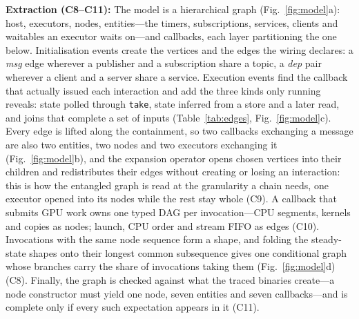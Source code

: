 \textbf{Extraction (C8--C11):} The model is a hierarchical graph (Fig.~\ref{fig:model}a): host, executors, nodes, entities---the timers, subscriptions, services, clients and waitables an executor waits on---and callbacks, each layer partitioning the one below. Initialisation events create the vertices and the edges the wiring declares: a \emph{msg} edge wherever a publisher and a subscription share a topic, a \emph{dep} pair wherever a client and a server share a service. Execution events find the callback that actually issued each interaction and add the three kinds only running reveals: state polled through \texttt{take}, state inferred from a store and a later read, and joins that complete a set of inputs (Table~\ref{tab:edges}, Fig.~\ref{fig:model}c). Every edge is lifted along the containment, so two callbacks exchanging a message are also two entities, two nodes and two executors exchanging it (Fig.~\ref{fig:model}b), and the expansion operator opens chosen vertices into their children and redistributes their edges without creating or losing an interaction: this is how the entangled graph is read at the granularity a chain needs, one executor opened into its nodes while the rest stay whole (C9). A callback that submits GPU work owns one typed DAG per invocation---CPU segments, kernels and copies as nodes; launch, CPU order and stream FIFO as edges (C10). Invocations with the same node sequence form a shape, and folding the steady-state shapes onto their longest common subsequence gives one conditional graph whose branches carry the share of invocations taking them (Fig.~\ref{fig:model}d) (C8). Finally, the graph is checked against what the traced binaries create---a node constructor must yield one node, seven entities and seven callbacks---and is complete only if every such expectation appears in it (C11).

